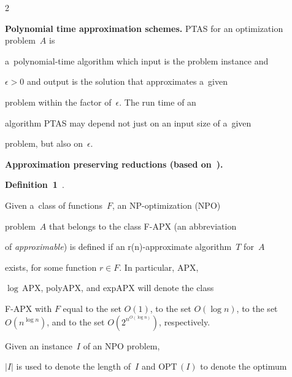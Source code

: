 \begin{multicols}{2}
\noindent


\textbf{Polynomial time approximation schemes.} {PTAS} for an optimization problem~$A$ is


a~polynomial-time algorithm which input is the problem instance and


$\epsilon > 0$ and output is the solution that approximates a~given


problem within the factor of~$\epsilon$. The run time of an


algorithm \mbox{PTAS} may depend not just on an input size of a~given


problem, but also on~$\epsilon$.





\smallskip





\noindent


\textbf{Approximation preserving reductions (based on~\cite{TrevisanLuca}).}





\smallskip





\noindent


\textbf{Definition~1}~\cite{TrevisanLuca}.


Given a~class of functions~$F$, an NP-optimization ({NPO})


problem~$A$  that belongs to the class {F-APX} (an abbreviation


of \textit{approximable}) is defined if an r(n)-approximate algorithm~$T$ for~$A$


exists, for some function $r \in F$. In particular, {APX},


$\log\,${APX}, poly{APX}, and exp{APX} will denote the class


{F-APX} with $F$ equal to the set $O(1)$, to the set $O(\log


n)$, to the set $O(n^{\log n})$, and to the set $O(2^{n^{O(\log


n)}})$, respectively.





\smallskip





Given an instance~$I$ of an {NPO} problem,


$|I|$ is used to denote the length of~$I$ and $\mathrm{OPT}\,(I)$ to denote the optimum



\end{multicols}
